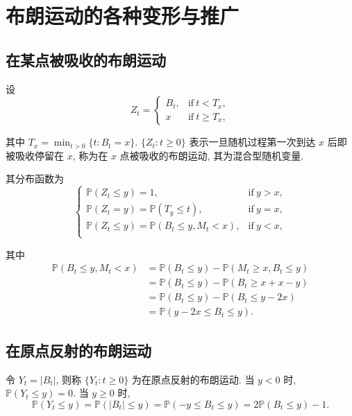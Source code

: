 \documentclass[openany]{ctexbook}
\theoremstyle{kaiti}
\theoremstyle{normal}
\begin{document}
\section{布朗运动的各种变形与推广}

\subsection{在某点被吸收的布朗运动}

设 
\begin{equation}
  Z_t=\begin{cases}B_t,&\text{if}~t<T_x,\\ x&\text{if}~t\geqslant T_x,\end{cases}
\end{equation}

其中 $T_x=\min_{t>0}\{t:B_t=x\}$. $\{Z_t:t\geqslant0\}$ 表示一旦随机过程第一次到达 $x$ 后即被吸收停留在 $x$, 称为在 $x$ 点被吸收的布朗运动, 其为混合型随机变量.

其分布函数为
\begin{equation}
  \begin{cases}
    \mathbb{P}(Z_t\leqslant y)=1,&\text{if}~y>x,\\
    \mathbb{P}(Z_t=y)=\mathbb{P}(T_y\leqslant t),&\text{if}~y=x,\\
    \mathbb{P}(Z_t\leqslant y)=\mathbb{P}(B_t\leqslant y,M_t<x),&\text{if}~y<x,\\
  \end{cases}
\end{equation}

其中 
\begin{equation}
  \begin{aligned}
    \mathbb{P}(B_t\leqslant y,M_t<x)
    &=\mathbb{P}(B_t\leqslant y)-\mathbb{P}(M_t\geqslant x,B_t\leqslant y)\\
    &=\mathbb{P}(B_t\leqslant y)-\mathbb{P}(B_t\geqslant x+x-y)\\
    &=\mathbb{P}(B_t\leqslant y)-\mathbb{P}(B_t\leqslant y-2x)\\
    &=\mathbb{P}(y-2x\leqslant B_t\leqslant y).
  \end{aligned}
\end{equation}

\subsection{在原点反射的布朗运动}
令 $Y_t=|B_t|$, 则称 $\{Y_t:t\geqslant0\}$ 为在原点反射的布朗运动. 当 $y<0$ 时, $\mathbb{P}(Y_t\leqslant y)=0$. 当 $y\geqslant0$ 时, 
\begin{equation}
  \mathbb{P}(Y_t\leqslant y)=\mathbb{P}(|B_t|\leqslant y)=\mathbb{P}(-y\leqslant B_t\leqslant y)=2\mathbb{P}(B_t\leqslant y)-1.
\end{equation}
\end{document}
